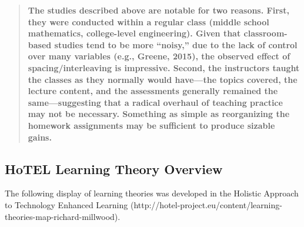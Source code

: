 \begin{quote}
\textbf{The studies described above are notable for two reasons. First,
they were conducted within a regular class (middle school mathematics,
college-level engineering). Given that classroom-based studies tend to
be more ``noisy,'' due to the lack of control over many variables (e.g.,
Greene, 2015), the observed effect of spacing/interleaving is
impressive. Second, the instructors taught the classes as they normally
would have---the topics covered, the lecture content, and the
assessments generally remained the same---suggesting that a radical
overhaul of teaching practice may not be necessary. Something as simple
as reorganizing the homework assignments may be sufficient to produce
sizable gains.}
\end{quote}

\newpage

\subsection{HoTEL Learning Theory Overview}\label{sec:hotel}

The following display of learning theories was developed in the Holistic
Approach to Technology Enhanced Learning
(http://hotel-project.eu/content/learning-theories-map-richard-millwood).

